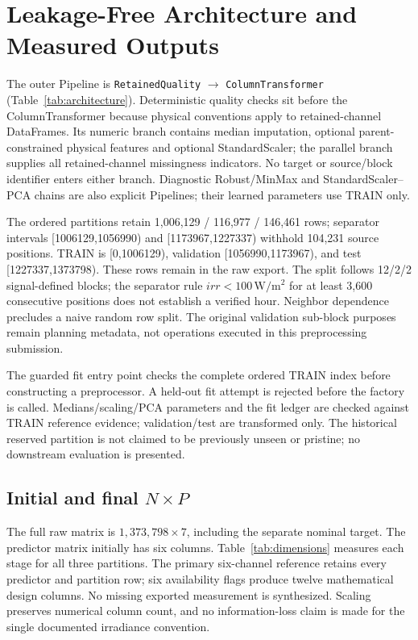 \documentclass[conference]{IEEEtran}
\begin{document}
\section{Leakage-Free Architecture and Measured Outputs}
The outer Pipeline is \texttt{RetainedQuality} $\rightarrow$ \texttt{ColumnTransformer}~\cite{sklearn} (Table~\ref{tab:architecture}). Deterministic quality checks sit before the ColumnTransformer because physical conventions apply to retained-channel DataFrames. Its numeric branch contains median imputation, optional parent-constrained physical features and optional StandardScaler; the parallel branch supplies all retained-channel missingness indicators. No target or source/block identifier enters either branch. Diagnostic Robust/MinMax and StandardScaler--PCA chains are also explicit Pipelines; their learned parameters use TRAIN only.

The ordered partitions retain 1,006,129 / 116,977 / 146,461 rows; separator intervals [1006129,1056990) and [1173967,1227337) withhold 104,231 source positions. TRAIN is [0,1006129), validation [1056990,1173967), and test [1227337,1373798). These rows remain in the raw export. The split follows 12/2/2 signal-defined blocks; the separator rule $irr<100\,\mathrm{W/m^2}$ for at least 3,600 consecutive positions does not establish a verified hour. Neighbor dependence precludes a naive random row split. The original validation sub-block purposes remain planning metadata, not operations executed in this preprocessing submission.

The guarded fit entry point checks the complete ordered TRAIN index before constructing a preprocessor. A held-out fit attempt is rejected before the factory is called. Medians/scaling/PCA parameters and the fit ledger are checked against TRAIN reference evidence; validation/test are transformed only. The historical reserved partition is not claimed to be previously unseen or pristine; no downstream evaluation is presented.

\subsection{Initial and final $N\times P$}
The full raw matrix is $1{,}373{,}798\times7$, including the separate nominal target. The predictor matrix initially has six columns. Table~\ref{tab:dimensions} measures each stage for all three partitions. The primary six-channel reference retains every predictor and partition row; six availability flags produce twelve mathematical design columns. No missing exported measurement is synthesized. Scaling preserves numerical column count, and no information-loss claim is made for the single documented irradiance convention.
\end{document}

